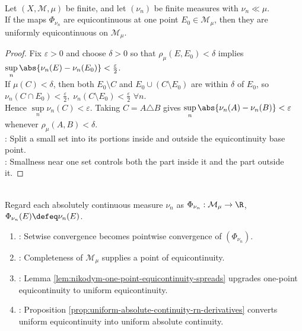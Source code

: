 \begin{lemma} \label{lem:nikodym-one-point-equicontinuity-spreads} \\
Let $(X,\mathcal{M},\mu)$ be finite, and let $(\nu_n)$ be finite measures with $\nu_n\ll\mu$.\\
If the maps $\Phi_{\nu_n}$ are equicontinuous at one point $E_0\in\mathcal{M}_\mu$, then they are uniformly equicontinuous on $\mathcal{M}_\mu$.
\begin{proof}
Fix $\varepsilon>0$ and choose $\delta>0$ so that $\rho_\mu(E,E_0)<\delta$ implies $\sup\limits_n\abs{\nu_n(E)-\nu_n(E_0)}<\frac{\varepsilon}{2}$.\\
If $\mu(C)<\delta$, then both $E_0\setminus C$ and $E_0\cup(C\setminus E_0)$ are within $\delta$ of $E_0$, so $\nu_n(C\cap E_0)<\frac{\varepsilon}{2},\; \nu_n(C\setminus E_0)<\frac{\varepsilon}{2}$ $\forall n$.\\
Hence $\sup\limits_n\nu_n(C)<\varepsilon$. Taking $C=A\triangle B$ gives $\sup\limits_n\abs{\nu_n(A)-\nu_n(B)}<\varepsilon$ whenever $\rho_\mu(A,B)<\delta$.\\
: Split a small set into its portions inside and outside the equicontinuity base point.\\
: Smallness near one set controls both the part inside it and the part outside it.
\end{proof}
\end{lemma}

\begin{method} \label{meth:vitali-hahn-saks-baire-mechanism} \\
Regard each absolutely continuous measure $\nu_n$ as $\Phi_{\nu_n}:\mathcal{M}_\mu\to\R$, $\Phi_{\nu_n}(E)\defeq\nu_n(E)$.
\begin{enumerate}[label=(\roman*)]
\setlength{\itemsep}{0pt}
\item {}: Setwise convergence becomes pointwise convergence of $(\Phi_{\nu_n})$.
\item {}: Completeness of $\mathcal{M}_\mu$ supplies a point of equicontinuity.
\item {}: Lemma \ref{lem:nikodym-one-point-equicontinuity-spreads} upgrades one-point equicontinuity to uniform equicontinuity.
\item {}: Proposition \ref{prop:uniform-absolute-continuity-rn-derivatives} converts uniform equicontinuity into uniform absolute continuity.
\end{enumerate}
\end{method}

